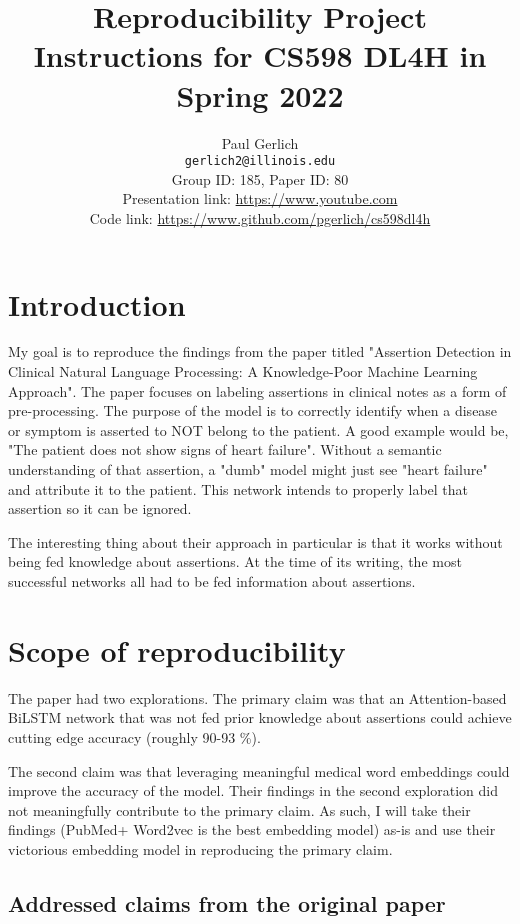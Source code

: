 \documentclass[11pt,a4paper]{article}
\title{Reproducibility Project Instructions for CS598 DL4H in Spring 2022}
\author{Paul Gerlich \\
  \texttt{gerlich2@illinois.edu}
  \\[2em]
  Group ID: 185, Paper ID: 80\\
  Presentation link: \url{https://www.youtube.com} \\
  Code link: \url{https://www.github.com/pgerlich/cs598dl4h}}
\begin{document}
\maketitle


\section{Introduction}
My goal is to reproduce the findings from the paper titled "Assertion Detection in Clinical Natural Language Processing: A Knowledge-Poor Machine Learning Approach". The paper focuses on labeling assertions in clinical notes as a form of pre-processing. The purpose of the model is to correctly identify when a disease or symptom is asserted to NOT belong to the patient. A good example would be, "The patient does not show signs of heart failure". Without a semantic understanding of that assertion, a "dumb" model might just see "heart failure" and attribute it to the patient. This network intends to properly label that assertion so it can be ignored.

The interesting thing about their approach in particular is that it works without being fed knowledge about assertions. At the time of its writing, the most successful networks all had to be fed information about assertions.

\section{Scope of reproducibility}

The paper had two explorations. The primary claim was that an Attention-based BiLSTM network that was not fed prior knowledge about assertions could achieve cutting edge accuracy (roughly 90-93 \%).

The second claim was that leveraging meaningful medical word embeddings could improve the accuracy of the model. Their findings in the second exploration did not meaningfully contribute to the primary claim. As such, I will take their findings (PubMed+ Word2vec is the best embedding model) as-is and use their victorious embedding model in reproducing the primary claim.

\subsection{Addressed claims from the original paper}
\end{document}
